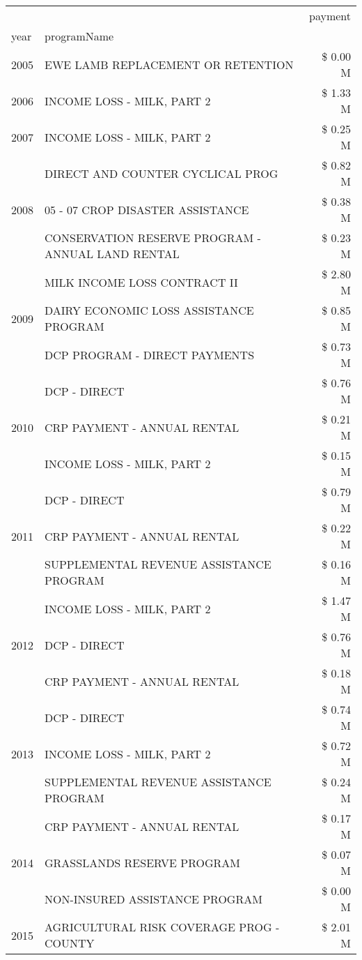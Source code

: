 \begin{tabular}{llr}
\toprule
 &  & payment \\
year & programName &  \\
\midrule
2005 & EWE LAMB REPLACEMENT OR RETENTION & \$ 0.00 M \\
\cline{1-3}
2006 & INCOME LOSS - MILK, PART 2 & \$ 1.33 M \\
\cline{1-3}
2007 & INCOME LOSS - MILK, PART 2 & \$ 0.25 M \\
\cline{1-3}
\multirow[t]{3}{*}{2008} & DIRECT AND COUNTER CYCLICAL PROG & \$ 0.82 M \\
 & 05 - 07 CROP DISASTER ASSISTANCE & \$ 0.38 M \\
 & CONSERVATION RESERVE PROGRAM - ANNUAL LAND RENTAL & \$ 0.23 M \\
\cline{1-3}
\multirow[t]{3}{*}{2009} & MILK INCOME LOSS CONTRACT II & \$ 2.80 M \\
 & DAIRY ECONOMIC LOSS ASSISTANCE PROGRAM & \$ 0.85 M \\
 & DCP PROGRAM - DIRECT PAYMENTS & \$ 0.73 M \\
\cline{1-3}
\multirow[t]{3}{*}{2010} & DCP - DIRECT & \$ 0.76 M \\
 & CRP PAYMENT - ANNUAL RENTAL & \$ 0.21 M \\
 & INCOME LOSS - MILK, PART 2 & \$ 0.15 M \\
\cline{1-3}
\multirow[t]{3}{*}{2011} & DCP - DIRECT & \$ 0.79 M \\
 & CRP PAYMENT - ANNUAL RENTAL & \$ 0.22 M \\
 & SUPPLEMENTAL REVENUE ASSISTANCE PROGRAM & \$ 0.16 M \\
\cline{1-3}
\multirow[t]{3}{*}{2012} & INCOME LOSS - MILK, PART 2 & \$ 1.47 M \\
 & DCP - DIRECT & \$ 0.76 M \\
 & CRP PAYMENT - ANNUAL RENTAL & \$ 0.18 M \\
\cline{1-3}
\multirow[t]{3}{*}{2013} & DCP - DIRECT & \$ 0.74 M \\
 & INCOME LOSS - MILK, PART 2 & \$ 0.72 M \\
 & SUPPLEMENTAL REVENUE ASSISTANCE PROGRAM & \$ 0.24 M \\
\cline{1-3}
\multirow[t]{3}{*}{2014} & CRP PAYMENT - ANNUAL RENTAL & \$ 0.17 M \\
 & GRASSLANDS RESERVE PROGRAM & \$ 0.07 M \\
 & NON-INSURED ASSISTANCE PROGRAM & \$ 0.00 M \\
\cline{1-3}
\multirow[t]{3}{*}{2015} & AGRICULTURAL RISK COVERAGE PROG - COUNTY & \$ 2.01 M \\

\end{tabular}
